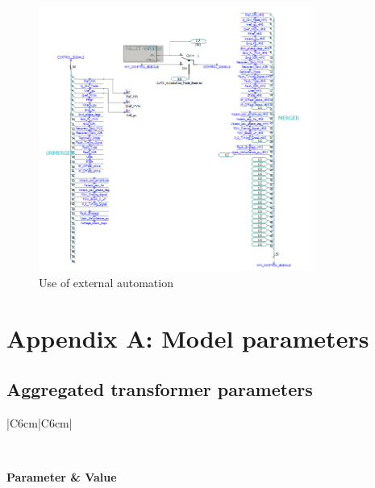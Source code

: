 \documentclass{../grid-link-report}
\newcommand{\projectassetsdir}{../project-assets}
\begin{document}
	\begin{figure}[H]
		\centering
		\includegraphics[width=0.8\textwidth]{report-assets/images/ext-auto-new.png}
		\caption{Use of external automation}
		\label{fig:ext-auto}
	\end{figure}

	
	
	
	\chapter{Appendix A: Model parameters}
	

	
	
	\section{Aggregated transformer parameters}
	
	
			
	{%
		\thicktablelines
		\begin{longtable}{|C{6cm}|C{6cm}|} 
			\caption{Grid transformer parameters}
			\label{tab:aggr-transformer}
			\\	
			\toprule
			
			\bfseries \color{white}Parameter & \bfseries \color{white}Value
			\endhead
			\bottomrule \endfoot
			\\\hline
		\end{longtable}
	}
	
\end{document}

